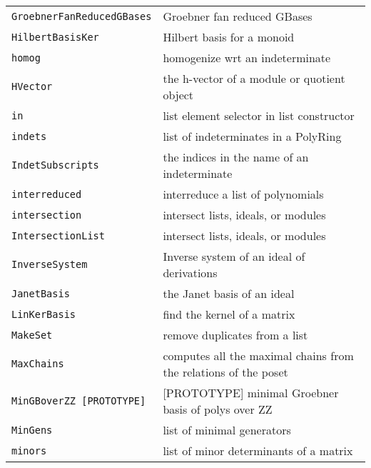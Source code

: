 \documentclass[a4paper]{mybook}
\begin{document}
\begin{center}
\begin{longtable}{ll}
{\verb~GroebnerFanReducedGBases~} &
      Groebner fan reduced GBases\\
   
{\verb~HilbertBasisKer~} &
      Hilbert basis for a monoid\\
   
{\verb~homog~} &
      homogenize wrt an indeterminate\\
   
{\verb~HVector~} &
      the h-vector of a module or quotient object\\
   
{\verb~in~} &
      list element selector in list constructor\\
   
{\verb~indets~} &
      list of indeterminates in a PolyRing\\
   
{\verb~IndetSubscripts~} &
      the indices in the name of an indeterminate\\
   
{\verb~interreduced~} &
      interreduce a list of polynomials\\
   
{\verb~intersection~} &
      intersect lists, ideals, or modules\\
   
{\verb~IntersectionList~} &
      intersect lists, ideals, or modules\\
   
{\verb~InverseSystem~} &
      Inverse system of an ideal of derivations\\
   
{\verb~JanetBasis~} &
      the Janet basis of an ideal\\
   
{\verb~LinKerBasis~} &
      find the kernel of a matrix\\
   
{\verb~MakeSet~} &
      remove duplicates from a list\\
   
{\verb~MaxChains~} &
      computes all the maximal chains from the relations of the poset\\
   
{\verb~MinGBoverZZ [PROTOTYPE]~} &
      [PROTOTYPE] minimal Groebner basis of polys over ZZ\\
   
{\verb~MinGens~} &
      list of minimal generators\\
   
{\verb~minors~} &
      list of minor determinants of a matrix\\
   

\end{longtable}
\end{center}
\end{document}
